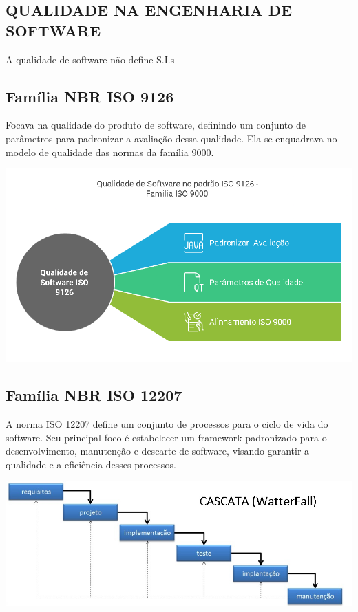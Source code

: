 \documentclass[
]{book}
\begin{document}
\subsection{QUALIDADE NA ENGENHARIA DE SOFTWARE}\label{qualidade-na-engenharia-de-software}

A qualidade de software não define S.I.s

\subsection{Família NBR ISO 9126}\label{famuxedlia-nbr-iso-9126}

Focava na qualidade do produto de software, definindo um conjunto de parâmetros para padronizar a avaliação dessa qualidade. Ela se enquadrava no modelo de qualidade das normas da família 9000.

\includegraphics{images/qualidade-geral/ISO-9126-SGSI.png}

\subsection{Família NBR ISO 12207}\label{famuxedlia-nbr-iso-12207}

A norma ISO 12207 define um conjunto de processos para o ciclo de vida do software. Seu principal foco é estabelecer um framework padronizado para o desenvolvimento, manutenção e descarte de software, visando garantir a qualidade e a eficiência desses processos.

\includegraphics{images/modelos_processos_software/Cascata.jpg}
\end{document}
